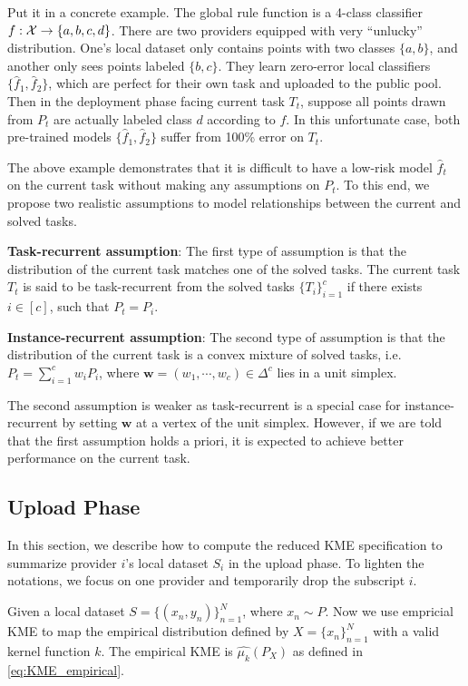 \documentclass[paper=letter, fontsize=20pt]{article}
\begin{document}
Put it in a concrete example. The global rule function is a 4-class classifier $f:\mathcal{X} \rightarrow \{a,b,c,d\}$. There are two providers equipped with very ``unlucky'' distribution. One's local dataset only contains points with two classes $\{a,b\}$, and another only sees points labeled $\{b,c\}$. They learn zero-error local classifiers $\{\widehat{f}_1,\widehat{f}_2\}$, which are perfect for their own task and uploaded to the public pool. Then in the deployment phase facing current task $T_t$, suppose all points drawn from $P_t$ are actually labeled class $d$ according to $f$. In this unfortunate case, both pre-trained models $\{\widehat{f}_1,\widehat{f}_2\}$ suffer from 100\% error on $T_t$.

The above example demonstrates that it is difficult to have a low-risk model $\widehat{f}_t$ on the current task without making any assumptions on $P_t$. To this end, we propose two realistic assumptions to model relationships between the current and solved tasks.

\textbf{Task-recurrent assumption}: The first type of assumption is that the distribution of the current task matches one of the solved tasks. The current task $T_t$ is said to be task-recurrent from the solved tasks $\{T_i\}_{i=1}^c$ if there exists $i\in [c]$, such that $P_t = P_i$. 


\textbf{Instance-recurrent assumption}: The second type of assumption is that the distribution of the current task is a convex mixture of solved tasks, i.e. $P_t = \sum_{i=1}^c w_i P_i$, where $\bm{w}=(w_1,\cdots,w_c)\in \Delta^c$ lies in a unit simplex. 

The second assumption is weaker as task-recurrent is a special case for instance-recurrent by setting $\bm{w}$ at a vertex of the unit simplex. However, if we are told that the first assumption holds a priori, it is expected to achieve better performance on the current task.


\subsection{Upload Phase}
In this section, we describe how to compute the reduced KME specification to summarize provider $i$'s local dataset $S_i$ in the upload phase. To lighten the notations, we focus on one provider and temporarily drop the subscript $i$. 

Given a local dataset $S=\{(x_n,y_n)\}_{n=1}^N$, where $x_n \sim P$. Now we use empricial KME to map the empirical distribution defined by $X=\{x_n\}_{n=1}^N$ with a valid kernel function $k$. The empirical KME is $\widehat{\mu_k}(P_X)$ as defined in \eqref{eq:KME_empirical}.
\end{document}
